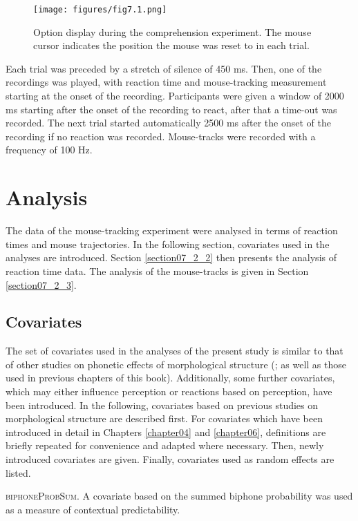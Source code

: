 \begin{figure}
    \centering
    \texttt{[image: figures/fig7.1.png]}
    \caption{Option display during the comprehension experiment. The mouse cursor indicates the position the mouse was reset to in each trial.}
    \label{fig:7_1}
\end{figure}

Each trial was preceded by a stretch of silence of 450 ms. Then, one of the recordings was played, with reaction time and mouse-tracking measurement starting at the onset of the recording. Participants were given a window of 2000 ms starting after the onset of the recording to react, after that a time-out was recorded. The next trial started automatically 2500 ms after the onset of the recording if no reaction was recorded. Mouse-tracks were recorded with a frequency of 100 Hz.

\section{Analysis}\label{section07_2}

The data of the mouse-tracking experiment were analysed in terms of reaction times and mouse trajectories. In the following section, covariates used in the analyses are introduced. Section \ref{section07_2_2} then presents the analysis of reaction time data. The analysis of the mouse-tracks is given in Section \ref{section07_2_3}.

\subsection{Covariates}\label{section07_2_1}

The set of covariates used in the analyses of the present study is similar to that of other studies on phonetic effects of morphological structure (\cite{Pluymaekers2005a, Pluymaekers2005b, Hanique2013Ernestus, Plag2017}; as well as those used in previous chapters of this book). Additionally, some further covariates, which may either influence perception or reactions based on perception, have been introduced. In the following, covariates based on previous studies on morphological structure are described first. For covariates which have been introduced in detail in Chapters \ref{chapter04} and \ref{chapter06}, definitions are briefly repeated for convenience and adapted where necessary. Then, newly introduced covariates are given. Finally, covariates used as random effects are listed.

\textsc{biphoneProbSum}. A covariate based on the summed biphone probability was used as a measure of contextual predictability.

